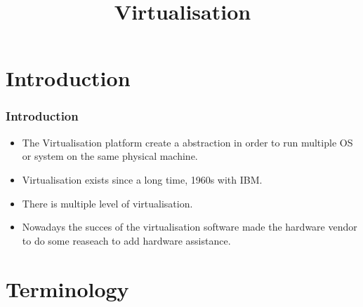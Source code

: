 %
%
%
%
%
%

%
%


%
%

\def\path{../../..}

%
%



%
%

\title{Virtualisation}

%
%



%
%

\begin{frame}
  \titlepage
\end{frame}

%
%

\begin{frame}
        \tableofcontents
\end{frame}


\section{Introduction}
\begin{frame}
\frametitle{Introduction}
\begin{itemize}
\item The Virtualisation platform create a abstraction
in order to run multiple OS or system on the same physical machine.
\item Virtualisation exists since a long time, 1960s with IBM.
\item There is multiple level of virtualisation.
\item Nowadays the succes of the virtualisation software made the
hardware vendor to do some reaseach to add hardware assistance.
\end{itemize}
\end{frame}

\section{Terminology}
